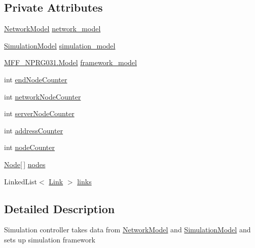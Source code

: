 \subsection*{Private Attributes}
\begin{DoxyCompactItemize}
\item 
\hyperlink{classNetTrafficSimulator_1_1NetworkModel}{Network\-Model} \hyperlink{classNetTrafficSimulator_1_1SimulationController_a80c4b1d3b982e591f530bf5877b259fa}{network\-\_\-model}
\item 
\hyperlink{classNetTrafficSimulator_1_1SimulationModel}{Simulation\-Model} \hyperlink{classNetTrafficSimulator_1_1SimulationController_a26441a135203881caae479f93f17e288}{simulation\-\_\-model}
\item 
\hyperlink{classMFF__NPRG031_1_1Model}{M\-F\-F\-\_\-\-N\-P\-R\-G031.\-Model} \hyperlink{classNetTrafficSimulator_1_1SimulationController_a3037a65e37c5c5e894bc584b8fe5c12d}{framework\-\_\-model}
\item 
int \hyperlink{classNetTrafficSimulator_1_1SimulationController_a9d07f9372ee5eeacefcb4d0448122f6d}{end\-Node\-Counter}
\item 
int \hyperlink{classNetTrafficSimulator_1_1SimulationController_a2b2363037a31bae97e4aede4af2512c4}{network\-Node\-Counter}
\item 
int \hyperlink{classNetTrafficSimulator_1_1SimulationController_a59a626f2fc2b81873ef548f2d7d04948}{server\-Node\-Counter}
\item 
int \hyperlink{classNetTrafficSimulator_1_1SimulationController_a79f2fd9be4b8d9070494975f9d470563}{address\-Counter}
\item 
int \hyperlink{classNetTrafficSimulator_1_1SimulationController_ada67d39ff4d7f0595b295b895216abf4}{node\-Counter}
\item 
\hyperlink{classNetTrafficSimulator_1_1Node}{Node}\mbox{[}$\,$\mbox{]} \hyperlink{classNetTrafficSimulator_1_1SimulationController_a63041df0cb83bab3ee4db1505656e806}{nodes}
\item 
Linked\-List$<$ \hyperlink{classNetTrafficSimulator_1_1Link}{Link} $>$ \hyperlink{classNetTrafficSimulator_1_1SimulationController_a5c83a56d28d5336e08efd3d893e47381}{links}
\end{DoxyCompactItemize}


\subsection{Detailed Description}
Simulation controller takes data from \hyperlink{classNetTrafficSimulator_1_1NetworkModel}{Network\-Model} and \hyperlink{classNetTrafficSimulator_1_1SimulationModel}{Simulation\-Model} and sets up simulation framework 

